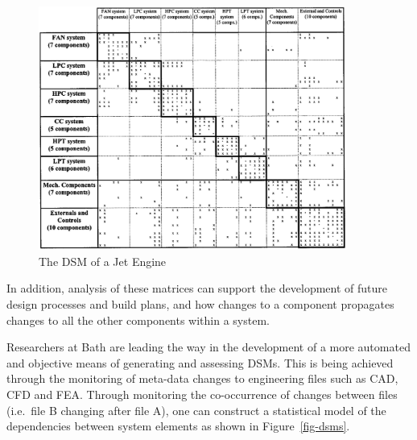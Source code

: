 \begin{figure}[h!]
\centering
\includegraphics[width=0.9\textwidth]{figs/sosa-dsm.png}
\caption{The DSM of a Jet Engine}
\label{fig-sosa}
\end{figure}

In addition, analysis of these matrices can support the development of future design processes and build plans, and how changes to a component propagates changes to all the other components within a system\cite[-8em]{jarratt2011}.

Researchers at Bath are leading the way in the development of a more automated and objective means of generating and assessing \ac{DSM}s\cite[-3em]{design2014}\cite{gopsill2016}. This is being achieved through the monitoring of meta-data changes to engineering files such as \acf{CAD}, \acf{CFD} and \acf{FEA}. 
Through monitoring the co-occurrence of changes between files (i.e.\ file B changing after file A), one can construct a statistical model of the dependencies between system elements as shown in Figure~\ref{fig-dsms}.

